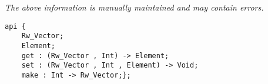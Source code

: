 \label{api:Unsafe\_Typelocked\_Rw\_Vector}

{\tiny \it The above information is manually maintained and may contain errors.}
\begin{verbatim}
api {
    Rw_Vector;
    Element;
    get : (Rw_Vector , Int) -> Element;
    set : (Rw_Vector , Int , Element) -> Void;
    make : Int -> Rw_Vector;};
\end{verbatim}
